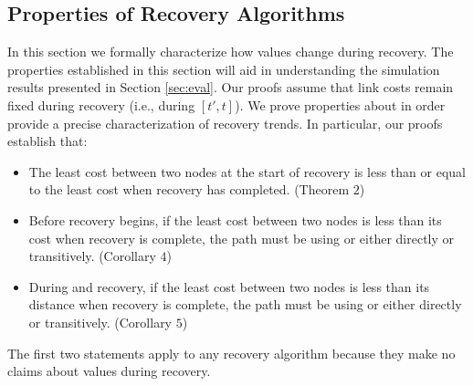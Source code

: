 \subsection{Properties of Recovery Algorithms}
\label{subsec:trends}

In this section we formally characterize how \minv values change during recovery. The properties established in this section will aid
in understanding the simulation results presented in Section \ref{sec:eval}. Our proofs assume that link costs remain fixed during recovery (i.e., during $[t',t]$).
We prove properties about \minv in order provide a precise characterization of recovery trends.  
In particular, our proofs establish that:

\begin{itemize}
	\item The least cost between two nodes at the start of recovery is less than or equal to the least cost when recovery has completed. (Theorem $2$)

	\item Before recovery begins, if the least cost between two nodes is less than its cost when recovery is complete, the path must 
  be using \badvector or \oldvector either directly or transitively. (Corollary $4$)

	\item During \second and \cpr recovery, if the least cost between two nodes is less than its distance when recovery is complete, the path must 
  be using \badvector or \oldvector either directly or transitively. (Corollary $5$)


\end{itemize}

The first two statements apply to any recovery algorithm because they make no claims about \minv values during recovery. 

